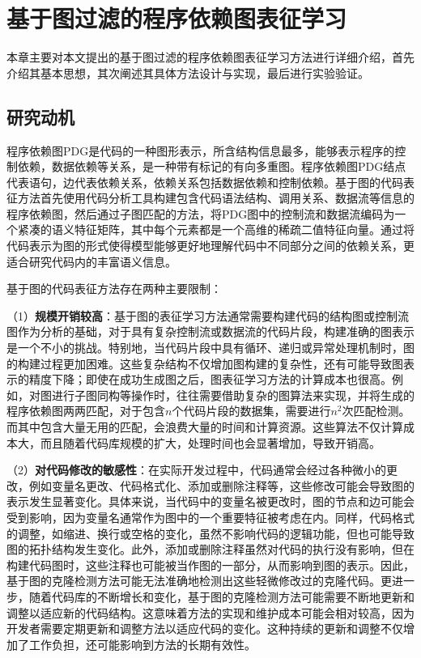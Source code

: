\chapter{基于图过滤的程序依赖图表征学习}
\label{chap:PDG}
本章主要对本文提出的基于图过滤的程序依赖图表征学习方法进行详细介绍，首先介绍其基本思想，其次阐述其具体方法设计与实现，最后进行实验验证。

\section{研究动机}
\label{sec:PDGMotivation}

程序依赖图PDG是代码的一种图形表示，所含结构信息最多，能够表示程序的控制依赖，数据依赖等关系，是一种带有标记的有向多重图。程序依赖图PDG结点代表语句，边代表依赖关系，依赖关系包括数据依赖和控制依赖\cite{Ammons1997ExploitingHP}。基于图的代码表征方法首先使用代码分析工具构建包含代码语法结构、调用关系、数据流等信息的程序依赖图，然后通过子图匹配的方法，将PDG图中的控制流和数据流编码为一个紧凑的语义特征矩阵，其中每个元素都是一个高维的稀疏二值特征向量\cite{10.1145/3236024.3236068}。通过将代码表示为图的形式使得模型能够更好地理解代码中不同部分之间的依赖关系，更适合研究代码内的丰富语义信息。

基于图的代码表征方法存在两种主要限制：

（1）\textbf{规模开销较高}：基于图的表征学习方法通常需要构建代码的结构图或控制流图作为分析的基础，对于具有复杂控制流或数据流的代码片段，构建准确的图表示是一个不小的挑战。特别地，当代码片段中具有循环、递归或异常处理机制时，图的构建过程更加困难。这些复杂结构不仅增加图构建的复杂性，还有可能导致图表示的精度下降；即使在成功生成图之后，图表征学习方法的计算成本也很高。例如，对图进行子图同构等操作时，往往需要借助复杂的图算法来实现，并将生成的程序依赖图两两匹配，对于包含$n$个代码片段的数据集，需要进行$n^2$次匹配检测。而其中包含大量无用的匹配，会浪费大量的时间和计算资源。这些算法不仅计算成本大，而且随着代码库规模的扩大，处理时间也会显著增加，导致开销高。

（2）\textbf{对代码修改的敏感性}：在实际开发过程中，代码通常会经过各种微小的更改，例如变量名更改、代码格式化、添加或删除注释等，这些修改可能会导致图的表示发生显著变化。具体来说，当代码中的变量名被更改时，图的节点和边可能会受到影响，因为变量名通常作为图中的一个重要特征被考虑在内。同样，代码格式的调整，如缩进、换行或空格的变化，虽然不影响代码的逻辑功能，但也可能导致图的拓扑结构发生变化。此外，添加或删除注释虽然对代码的执行没有影响，但在构建代码图时，这些注释也可能被当作图的一部分，从而影响到图的表示。因此，基于图的克隆检测方法可能无法准确地检测出这些轻微修改过的克隆代码。更进一步，随着代码库的不断增长和变化，基于图的克隆检测方法可能需要不断地更新和调整以适应新的代码结构。这意味着方法的实现和维护成本可能会相对较高，因为开发者需要定期更新和调整方法以适应代码的变化。这种持续的更新和调整不仅增加了工作负担，还可能影响到方法的长期有效性。

